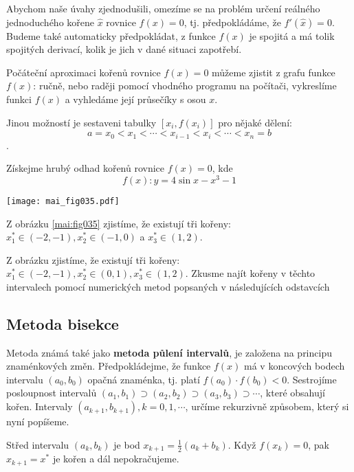       Abychom naše úvahy zjednodušili, omezíme se na problém určení re\-ál\-né\-ho
      je\-dno\-du\-ché\-ho kořene $\hat{x}$ rovnice $f(x)=0$, tj. předpokládáme, že $f'(\hat{x})=0$.
      Budeme také automaticky předpokládat, z funkce $f(x)$ je spojitá a má tolik spojitých 
      derivací, kolik je jich v dané situaci zapotřebí.
  
      Počáteční aproximaci kořenů rovnice $f(x)=0$ můžeme zjistit z grafu funkce $f(x)$: ručně, nebo
      raději pomocí vhodného programu na počítači, vykreslíme funkci $f(x)$ a vyhledáme její
      průsečíky s osou $x$.
  
      Jinou možností je sestaveni tabulky $[x_i,f(x_i)]$ pro nějaké dělení:
      $$a=x_0<x_1<\cdots<x_{i-1}<x_i<\cdots<x_n=b$$.
      \begin{example} Získejme hrubý odhad kořenů rovnice $f(x) = 0$, kde $$f(x):y=4\sin x - x^3 - 
      1$$

          {\centering
           \captionsetup{type=figure}
           \texttt{[image: mai\_fig035.pdf]}
           \label{mai:fig035}
           \par}
        Z obrázku \ref{mai:fig035} zjistíme, že existují tři kořeny: $x_1^*\in(-2,-1),
        x_2^*\in(-1, 0)$ a $x_3^*\in(1, 2)$.
      \end{example}
  
      Z obrázku zjistíme, že existují tři kořeny: $x_1^*\in(-2,-1),x_2^*\in(0,1),x_3^*\in(1,2)$.
      Zkusme najít kořeny v těchto intervalech pomocí numerických metod popsaných v následujících
      odstavcích
  
    \subsection{Metoda bisekce}
      Metoda známá také jako \textbf{metoda půlení intervalů}, je založena na principu
      zna\-mén\-ko\-vých změn. Předpokládejme, že funkce $f(x)$ má v koncových bodech intervalu
      $(a_0,b_0)$ opačná znaménka, tj. platí $f(a_0 )\cdot f(b_0 )<0$. Sestrojíme posloupnost
      intervalů $(a_1,b_1)\supset(a_2,b_2)\supset(a_3,b_3)\supset\cdots$, které obsahují kořen.
      Intervaly $(a_{k+1},b_{k+1}), k=0,1,\cdots$, určíme rekurzivně způsobem, který si nyní
      popíšeme.
  
      Střed intervalu $(a_k,b_k)$ je bod $x_{k+1}=\frac{1}{2}(a_k+b_k)$. Když $f(x_k)=0$, pak
      $x_{k+1}=x^*$ je kořen a dál nepokračujeme.

\printbibliography[heading=subbibliography]
